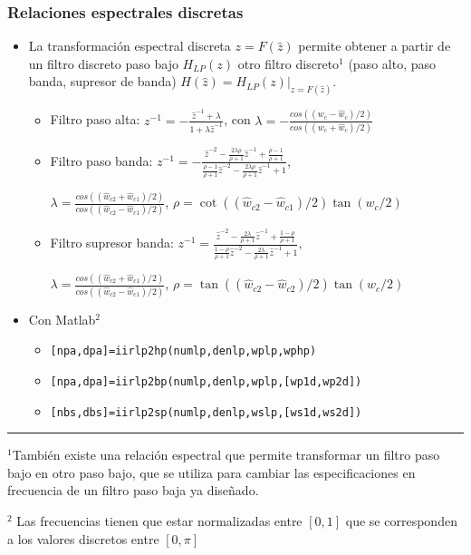 \begin{frame}
\frametitle{Relaciones espectrales discretas}

\begin{itemize}
\footnotesize
\item La transformación espectral discreta $z=F(\hat z)$ permite obtener a partir de un filtro discreto paso bajo $H_{LP}(z)$  otro filtro discreto$^1$ (paso alto, paso banda, supresor de banda) $H(\hat z)=H_{LP}(z)|_{z=F(\hat z)}$.
\begin{itemize}
\footnotesize

\item Filtro paso alta: $z^{-1}=-\frac{\hat z^{-1}+\lambda}{1+\lambda \hat z^{-1}}$, con
$\lambda=-\frac{cos((w_c-	\hat w_c)/2)}{cos((w_c+	\hat w_c)/2)}$



\item Filtro paso banda: $z^{-1}=-\frac{\hat z^{-2}-\frac{2\lambda \rho}{\rho+1}\hat z^{-1}+\frac{\rho-1}{\rho+1}}{\frac{\rho-1}{\rho+1}\hat z^{-2}-\frac{2\lambda \rho}{\rho+1}\hat z^{-1}+1}$,

$\lambda=\frac{cos((\hat w_{c2}+	\hat w_{c1})/2)}{cos((\hat w_{c2}-	\hat w_{c1})/2)}$, $\rho=\cot((\hat w_{c2}-\hat w_{c1})/2)\tan(w_c/2)$

\item Filtro supresor banda: $z^{-1}=\frac{\hat z^{-2}-\frac{2\lambda}{\rho+1}\hat z^{-1}+\frac{1-\rho}{\rho+1}}{\frac{1-\rho}{\rho+1}\hat z^{-2}-\frac{2\lambda}{\rho+1}\hat z^{-1}+1}$,

$\lambda=\frac{cos((\hat w_{c2}+\hat w_{c1})/2)}{cos((\hat w_{c2}-\hat w_{c1})/2)}$, $\rho=\tan((\hat w_{c2}-\hat w_{c2})/2)\tan(w_c/2)$


\end{itemize}

\item Con Matlab$^{2}$
\begin{itemize}
\footnotesize
\item \texttt{[npa,dpa]=iirlp2hp(numlp,denlp,wplp,wphp)}
\item \texttt{[npa,dpa]=iirlp2bp(numlp,denlp,wplp,[wp1d,wp2d])}
\item \texttt{[nbs,dbs]=iirlp2sp(numlp,denlp,wslp,[ws1d,ws2d])}
\end{itemize}
\end{itemize}

\vspace{-0.2cm}
\rule{10cm}{0.4pt}

\scriptsize
$^1$También existe una relación espectral que permite transformar un filtro paso bajo en otro paso bajo, que se utiliza para cambiar las especificaciones en frecuencia de un filtro paso baja ya diseñado.

$^2$ Las frecuencias tienen que estar  normalizadas entre $[0,1]$ que se corresponden a los valores discretos entre $[0,\pi]$


\end{frame}



